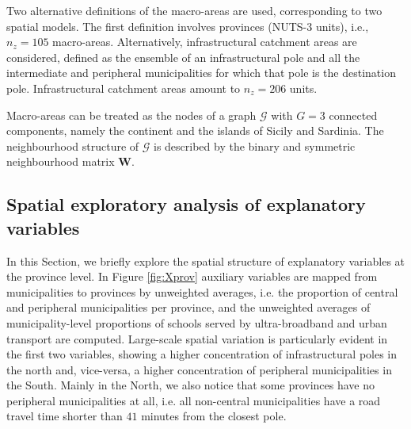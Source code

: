 \documentclass[openany, 11pt, oneside]{book}
\begin{document}
Two alternative definitions of the macro-areas are used, corresponding to two spatial models. The first definition involves provinces (NUTS-3 units), i.e., $n_z = 105$ macro-areas. Alternatively, infrastructural catchment areas are considered, defined as the ensemble of an infrastructural pole and all the intermediate and peripheral municipalities for which that pole is the destination pole. Infrastructural catchment areas amount to $n_z = 206$ units.

Macro-areas can be treated as the nodes of a graph $\mathcal{G}$ with $G = 3$ connected components, namely the continent and the islands of Sicily and Sardinia. The neighbourhood structure of $\mathcal{G}$ is described by the binary and symmetric neighbourhood matrix $\boldsymbol{W}$.

\subsection{Spatial exploratory analysis of explanatory variables} \label{par:X}

In this Section, we briefly explore the spatial structure of explanatory variables at the province level.
In Figure \ref{fig:Xprov} auxiliary variables are mapped from municipalities to provinces by unweighted averages, i.e. the proportion of central and peripheral municipalities per province, and the unweighted averages of municipality-level proportions of schools served by ultra-broadband and urban transport are computed. Large-scale spatial variation is particularly evident in the first two variables, showing a higher concentration of infrastructural poles in the north and, vice-versa, a higher concentration of peripheral municipalities in the South. Mainly in the North, we also notice that some provinces have no peripheral municipalities at all, i.e. all non-central municipalities have a road travel time shorter than $41$ minutes \parencite{InnerAreas} from the closest pole.
\end{document}
